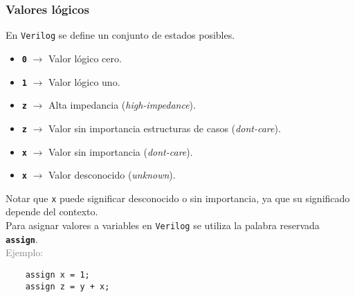 \documentclass[aspectratio=169]{beamer}
\begin{document}
\begin{frame}[fragile,t]
    \frametitle{Valores lógicos}
    En \texttt{Verilog} se define un conjunto de estados posibles.
    \begin{itemize}
     \setlength\itemsep{0cm}
      \item[] \textbf{\texttt{0}} \hspace{0.5cm} $\rightarrow$ \hspace{0.5cm} Valor lógico cero.
      \item[] \textbf{\texttt{1}} \hspace{0.5cm} $\rightarrow$ \hspace{0.5cm} Valor lógico uno.
      \item[] \textbf{\texttt{z}} \hspace{0.5cm} $\rightarrow$ \hspace{0.5cm} Alta impedancia (\emph{high-impedance}).
      \item[] \textbf{\texttt{z}} \hspace{0.5cm} $\rightarrow$ \hspace{0.5cm} Valor sin importancia estructuras de casos (\emph{dont-care}).
      \item[] \textbf{\texttt{x}} \hspace{0.5cm} $\rightarrow$ \hspace{0.5cm} Valor sin importancia (\emph{dont-care}).
      \item[] \textbf{\texttt{x}} \hspace{0.5cm} $\rightarrow$ \hspace{0.5cm} Valor desconocido (\emph{unknown}).
    \end{itemize}
    \textcolor{verdeuca}{\small Notar que \texttt{x} puede significar desconocido o sin importancia, ya que su significado depende del contexto.\\}
    \bigskip
    \pause
    Para asignar valores a variables en \texttt{Verilog} se utiliza la palabra reservada \textbf{\texttt{assign}}.\\
    \vspace{0.2cm}
    \textcolor{gray}{Ejemplo:}
\begin{lstlisting}
    assign x = 1;
    assign z = y + x;
\end{lstlisting}
\end{frame}
\end{document}
